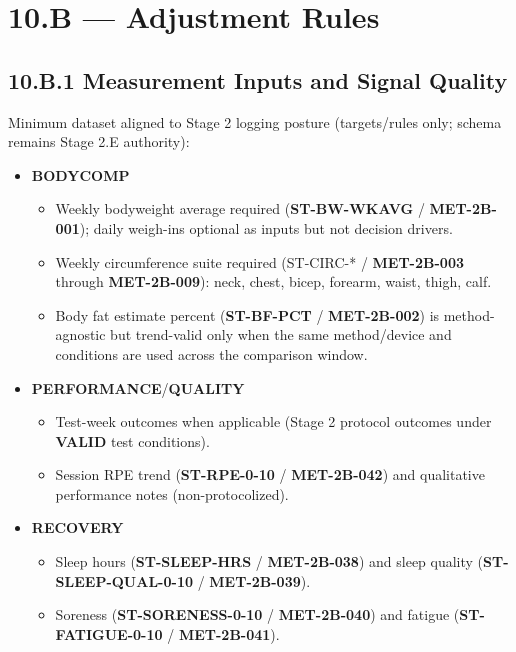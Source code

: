 \documentclass[10pt]{article}
\begin{document}
\section*{10.B — Adjustment Rules}
{}

\subsection*{10.B.1 Measurement Inputs and Signal Quality}
{}

Minimum dataset aligned to Stage 2 logging posture (targets/rules only; schema remains Stage 2.E authority):

\begin{itemize}
\item \textbf{BODYCOMP}
\begin{itemize}
\item Weekly bodyweight average required (\textbf{ST-BW-WKAVG} / \textbf{MET-2B-001}); daily weigh-ins optional as inputs but not decision drivers.
\item Weekly circumference suite required (ST-CIRC-* / \textbf{MET-2B-003} through \textbf{MET-2B-009}): neck, chest, bicep, forearm, waist, thigh, calf.
\item Body fat estimate percent (\textbf{ST-BF-PCT} / \textbf{MET-2B-002}) is method-agnostic but trend-valid only when the same method/device and conditions are used across the comparison window.
\end{itemize}
\item \textbf{PERFORMANCE}/\textbf{QUALITY}
\begin{itemize}
\item Test-week outcomes when applicable (Stage 2 protocol outcomes under \textbf{VALID} test conditions).
\item Session RPE trend (\textbf{ST-RPE-0-10} / \textbf{MET-2B-042}) and qualitative performance notes (non-protocolized).
\end{itemize}
\item \textbf{RECOVERY}
\begin{itemize}
\item Sleep hours (\textbf{ST-SLEEP-HRS} / \textbf{MET-2B-038}) and sleep quality (\textbf{ST-SLEEP-QUAL-0-10} / \textbf{MET-2B-039}).
\item Soreness (\textbf{ST-SORENESS-0-10} / \textbf{MET-2B-040}) and fatigue (\textbf{ST-FATIGUE-0-10} / \textbf{MET-2B-041}).

\end{itemize}
\end{itemize}
\end{document}
